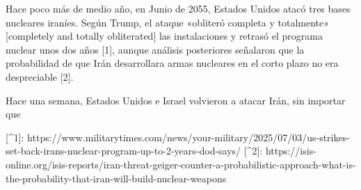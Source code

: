 \documentclass[a4paper, 12pt]{article}
\begin{document}
Hace poco más de medio año, en Junio de 2055, Estados Unidos atacó tres bases
nucleares iraníes. Según Trump, el ataque «obliteró completa y totalmente»
[completely and totally obliterated] las instalaciones y retrasó el programa
nuclear unos dos años [1], aunque análisis posteriores señalaron que la
probabilidad de que Irán desarrollara armas nucleares en el corto plazo no era
despreciable [2]. 

Hace una semana, Estados Unidos e Israel volvieron a atacar Irán, sin importar
que 




\pagebreak




[^1]: https://www.militarytimes.com/news/your-military/2025/07/03/us-strikes-set-back-irans-nuclear-program-up-to-2-years-dod-says/
[^2]: https://isis-online.org/isis-reports/iran-threat-geiger-counter-a-probabilistic-approach-what-is-the-probability-that-iran-will-build-nuclear-weapons
\end{document}
